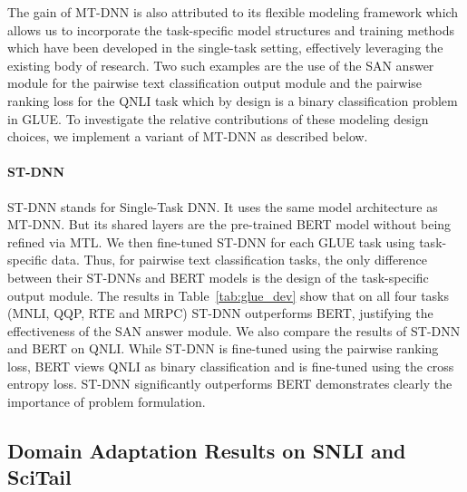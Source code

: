 The gain of MT-DNN is also attributed to its flexible modeling framework which allows us to incorporate the task-specific model structures and training methods which have been developed in the single-task setting, effectively leveraging the existing body of research. Two such examples are the use of the SAN answer module for the pairwise text classification output module and the pairwise ranking loss for the QNLI task which by design is a binary classification problem in GLUE. To investigate the relative contributions of these modeling design choices, we implement a variant of MT-DNN as described below.

\paragraph{ST-DNN} ST-DNN stands for Single-Task DNN. It uses the same model architecture as MT-DNN. But its shared layers are the pre-trained BERT model without being refined via MTL. We then fine-tuned ST-DNN for each GLUE task using task-specific data. Thus, for pairwise text classification tasks, the only difference between their ST-DNNs and BERT models is the design of the task-specific output module. The results in Table~\ref{tab:glue_dev} show that on all four tasks (MNLI, QQP, RTE and MRPC) ST-DNN outperforms BERT, justifying the effectiveness of the SAN answer module. We also compare the results of ST-DNN and BERT on QNLI. While ST-DNN is fine-tuned using the pairwise ranking loss, BERT views QNLI as binary classification and is fine-tuned using the cross entropy loss. ST-DNN significantly outperforms BERT demonstrates clearly the importance of problem formulation.


\subsection{Domain Adaptation Results on SNLI and SciTail}
\label{subsec:domain}

